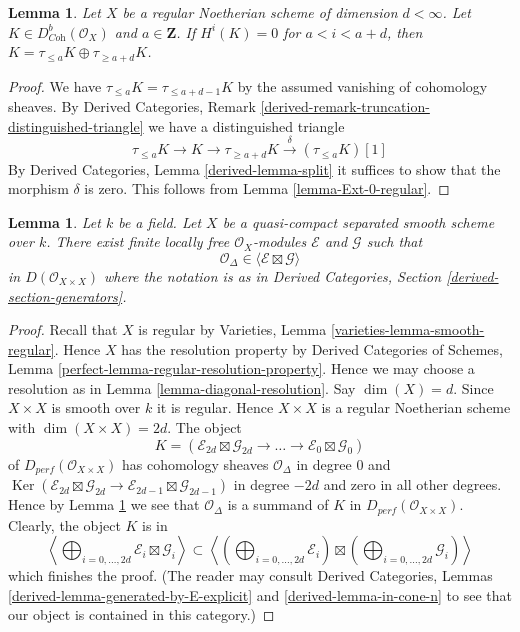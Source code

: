 \documentclass{stacks-project}
\theoremstyle{plain}
\newtheorem{lemma}[subsection]{Lemma}
\theoremstyle{definition}
\theoremstyle{remark}
\numberwithin{equation}{subsection}
\def\Ker{\mathop{\mathrm{Ker}}}
\begin{document}
\begin{lemma}
\label{lemma-split-complex-regular}
Let $X$ be a regular Noetherian scheme of dimension $d < \infty$.
Let $K \in D^b_{\textit{Coh}}(\mathcal{O}_X)$ and $a \in \mathbf{Z}$.
If $H^i(K) = 0$ for $a < i < a + d$, then
$K = \tau_{\leq a}K \oplus \tau_{\geq a + d}K$.
\end{lemma}

\begin{proof}
We have $\tau_{\leq a}K = \tau_{\leq a + d - 1}K$ by the assumed
vanishing of cohomology sheaves. By Derived Categories, Remark
\ref{derived-remark-truncation-distinguished-triangle}
we have a distinguished triangle
$$
\tau_{\leq a}K \to K \to \tau_{\geq a + d}K \xrightarrow{\delta}
(\tau_{\leq a}K)[1]
$$
By Derived Categories, Lemma \ref{derived-lemma-split} it
suffices to show that the morphism $\delta$ is zero.
This follows from Lemma \ref{lemma-Ext-0-regular}.
\end{proof}

\begin{lemma}
\label{lemma-diagonal-trick}
Let $k$ be a field. Let $X$ be a quasi-compact separated smooth scheme over $k$.
There exist finite locally free $\mathcal{O}_X$-modules
$\mathcal{E}$ and $\mathcal{G}$ such that
$$
\mathcal{O}_\Delta \in \langle \mathcal{E} \boxtimes \mathcal{G} \rangle
$$
in $D(\mathcal{O}_{X \times X})$ where the notation is as in
Derived Categories, Section \ref{derived-section-generators}.
\end{lemma}

\begin{proof}
Recall that $X$ is regular by
Varieties, Lemma \ref{varieties-lemma-smooth-regular}.
Hence $X$ has the resolution property by
Derived Categories of Schemes, Lemma
\ref{perfect-lemma-regular-resolution-property}.
Hence we may choose a resolution as in Lemma \ref{lemma-diagonal-resolution}.
Say $\dim(X) = d$. Since $X \times X$ is smooth over $k$ it is regular.
Hence $X \times X$ is a regular Noetherian scheme with
$\dim(X \times X) = 2d$. The object
$$
K = (\mathcal{E}_{2d} \boxtimes \mathcal{G}_{2d} \to
\ldots \to
\mathcal{E}_0 \boxtimes \mathcal{G}_0)
$$
of $D_{perf}(\mathcal{O}_{X \times X})$
has cohomology sheaves $\mathcal{O}_\Delta$
in degree $0$ and $\Ker(\mathcal{E}_{2d} \boxtimes \mathcal{G}_{2d} \to
\mathcal{E}_{2d-1} \boxtimes \mathcal{G}_{2d-1})$ in degree $-2d$ and zero
in all other degrees.
Hence by Lemma \ref{lemma-split-complex-regular} we see that
$\mathcal{O}_\Delta$ is a summand of $K$ in
$D_{perf}(\mathcal{O}_{X \times X})$.
Clearly, the object $K$ is in
$$
\left\langle
\bigoplus\nolimits_{i = 0, \ldots, 2d} \mathcal{E}_i \boxtimes \mathcal{G}_i
\right\rangle
\subset
\left\langle
\left(\bigoplus\nolimits_{i = 0, \ldots, 2d} \mathcal{E}_i\right)
\boxtimes
\left(\bigoplus\nolimits_{i = 0, \ldots, 2d} \mathcal{G}_i\right)
\right\rangle
$$
which finishes the proof. (The reader may consult
Derived Categories, Lemmas \ref{derived-lemma-generated-by-E-explicit} and
\ref{derived-lemma-in-cone-n} to see that our object is contained in this
category.)
\end{proof}
\end{document}
